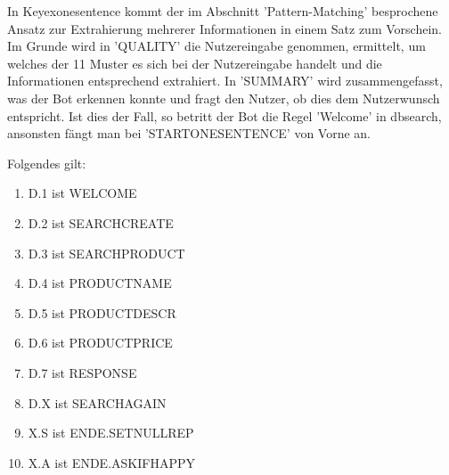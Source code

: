 In Keyexonesentence kommt der im Abschnitt 'Pattern-Matching' besprochene Ansatz zur Extrahierung mehrerer Informationen in einem Satz zum Vorschein. 
Im Grunde wird in 'QUALITY' die Nutzereingabe genommen, ermittelt, um welches der 11 Muster es sich bei der Nutzereingabe handelt und die Informationen entsprechend extrahiert. 
In 'SUMMARY' wird zusammengefasst, was der Bot erkennen konnte und fragt den Nutzer, ob dies dem Nutzerwunsch entspricht. Ist dies der Fall, so betritt der Bot die Regel 'Welcome' in dbsearch, ansonsten fängt man bei 'STARTONESENTENCE' von Vorne an. 

\begin{center}
\end{center}

Folgendes gilt: 

\begin{enumerate}
\item{D.1 ist WELCOME}
\item{D.2 ist SEARCHCREATE}
\item{D.3 ist SEARCHPRODUCT}
\item{D.4 ist PRODUCTNAME}
\item{D.5 ist PRODUCTDESCR}
\item{D.6 ist PRODUCTPRICE}
\item{D.7 ist RESPONSE}
\item{D.X ist SEARCHAGAIN}
\item{X.S ist ENDE.SETNULLREP}
\item{X.A ist ENDE.ASKIFHAPPY}
\end{enumerate}


